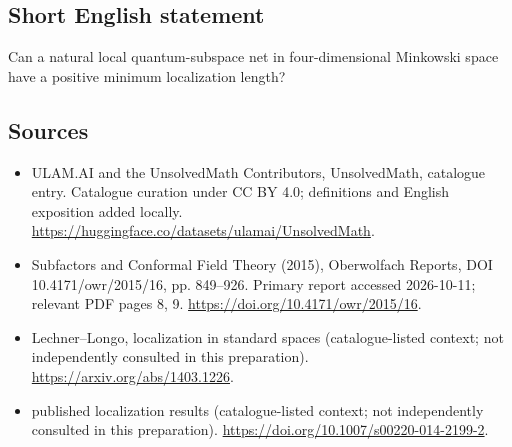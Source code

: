 \documentclass[11pt]{article}
\begin{document}
\subsection{Short English statement}
Can a natural local quantum-subspace net in four-dimensional Minkowski space have a positive minimum localization length?
\subsection{Sources}
\begin{itemize}
\item[\hypertarget{source:statement:1}{S1}] ULAM.AI and the UnsolvedMath Contributors, UnsolvedMath, catalogue entry. Catalogue curation under CC BY 4.0; definitions and English exposition added locally.
\url{https://huggingface.co/datasets/ulamai/UnsolvedMath}.
\item[\hypertarget{source:statement:2}{S2}] Subfactors and Conformal Field Theory (2015), Oberwolfach Reports, DOI 10.4171/owr/2015/16, pp. 849--926. Primary report accessed 2026-10-11; relevant PDF pages 8, 9.
\url{https://doi.org/10.4171/owr/2015/16}.
\item[\hypertarget{source:statement:3}{S3}] Lechner--Longo, localization in standard spaces (catalogue-listed context; not independently consulted in this preparation).
\url{https://arxiv.org/abs/1403.1226}.
\item[\hypertarget{source:statement:4}{S4}] published localization results (catalogue-listed context; not independently consulted in this preparation).
\url{https://doi.org/10.1007/s00220-014-2199-2}.
\end{itemize}
\label{end:statement}
\end{document}
